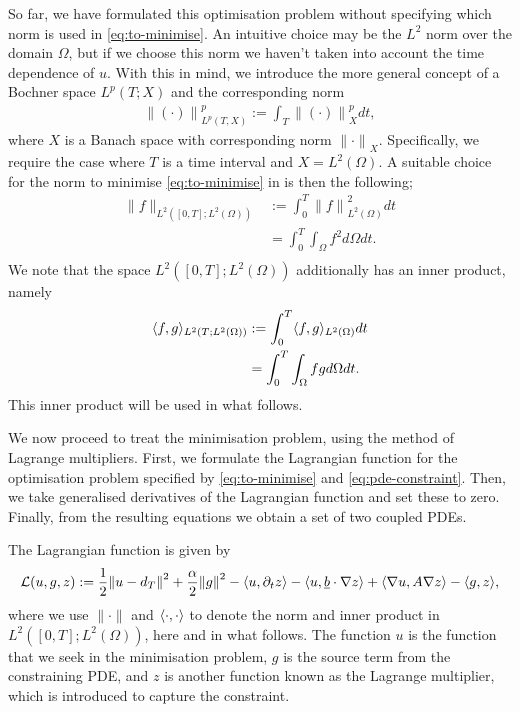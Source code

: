 \documentclass{article}  %
\begin{document}
So far, we have formulated this optimisation problem without specifying which norm is used in \autoref{eq:to-minimise}. An intuitive choice may be the $L^2$ norm over the domain $\Omega$, but if we choose this norm we haven't taken into account the time dependence of $u$. With this in mind, we introduce the more general concept of a Bochner space $L^p(T;X)$ and the corresponding norm
%
\begin{align} 
    {\lVert (\cdot) \rVert}^p_{L^p(T,X)} := \int_{T} {\lVert (\cdot)\rVert}^p_X dt, 
\end{align}
%
where $X$ is a Banach space with corresponding norm ${\lVert \cdot\rVert}_X$. Specifically, we require the case where $T$ is a time interval and $X=L^2(\Omega)$. A suitable choice for the norm to minimise \autoref{eq:to-minimise} in is then the following;
%
\begin{align} 
    \lVert f \rVert_{L^2([0,T];L^2(\Omega))} &:= \int_{0}^{T}  {\lVert f \rVert}^2_{L^2(\Omega)} dt\\
    &= \int_{0}^{T} \int_{\Omega} f^2 d\Omega dt.\\
\end{align}
%
We note that the space $L^2([0,T];L^2(\Omega))$ additionally has an inner product, namely
%
\begin{align} 
    \langle f, g \rangle_{L^2(T;L^2(\Omega))} &:= \int_{0}^{T} \langle f, g \rangle_{L^2(\Omega)} dt \\
    & = \int_{0}^{T} \int_{\Omega} fg d\Omega dt.
\end{align}
%
This inner product will be used in what follows.

We now proceed to treat the minimisation problem, using the method of Lagrange multipliers. First, we formulate the Lagrangian function for the optimisation problem specified by \autoref{eq:to-minimise} and \autoref{eq:pde-constraint}. Then, we take generalised derivatives of the Lagrangian function and set these to zero. Finally, from the resulting equations we obtain a set of two coupled PDEs.

The Lagrangian function is given by
%
\begin{align} 
    \mathcal{L}(u,g,z) := \frac{1}{2} {\lVert u - d_T \rVert}^2 + \frac{\alpha}{2} {\lVert g \rVert}^2 - \langle u, \partial_t z \rangle - \langle u, \underline{b} \cdot \nabla z \rangle + \langle \nabla u, A \nabla z \rangle - \langle g, z \rangle,
\end{align}
%
where we use $\lVert \cdot \rVert$ and $\langle \cdot, \cdot \rangle$ to denote the norm and inner product in $L^2([0,T];L^2(\Omega))$, here and in what follows. The function $u$ is the function that we seek in the minimisation problem, $g$ is the source term from the constraining PDE, and $z$ is another function known as the Lagrange multiplier, which is introduced to capture the constraint.
\end{document}
